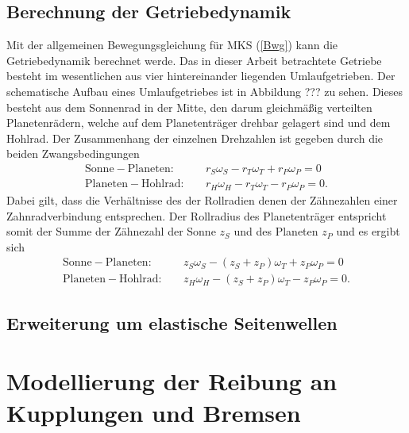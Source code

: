 \subsection{Berechnung der Getriebedynamik}
Mit der allgemeinen Bewegungsgleichung für MKS (\ref{Bwg}) kann die Getriebedynamik berechnet werde. Das in dieser Arbeit betrachtete Getriebe besteht im wesentlichen aus vier hintereinander liegenden Umlaufgetrieben. Der schematische Aufbau eines Umlaufgetriebes ist in Abbildung ??? zu sehen. Dieses besteht aus dem Sonnenrad in der Mitte, den darum gleichmäßig verteilten Planetenrädern, welche auf dem Planetenträger drehbar gelagert sind und dem Hohlrad. Der Zusammenhang der einzelnen Drehzahlen ist gegeben durch die beiden Zwangsbedingungen
\begin{align}
\mathrm{Sonne - Planeten}:\quad &r_S\omega_S - r_T\omega_T+ r_P\omega_P=0 \\
\mathrm{Planeten - Hohlrad}:\quad &r_H\omega_H - r_T\omega_T- r_P\omega_P=0.
\end{align}
Dabei gilt, dass die Verhältnisse des der Rollradien denen der Zähnezahlen einer Zahnradverbindung entsprechen. Der Rollradius des Planetenträger entspricht somit der Summe der Zähnezahl der Sonne $z_S$ und des Planeten $z_P$ und es ergibt sich
\begin{align}
\mathrm{Sonne - Planeten}:\quad &z_S\omega_S - (z_S + z_P)\omega_T+ z_P\omega_P=0 \\
\mathrm{Planeten - Hohlrad}:\quad &z_H\omega_H - (z_S + z_P)\omega_T- z_P\omega_P=0.
\end{align}

\subsection{Erweiterung um elastische Seitenwellen}

\section{Modellierung der Reibung an Kupplungen und Bremsen}